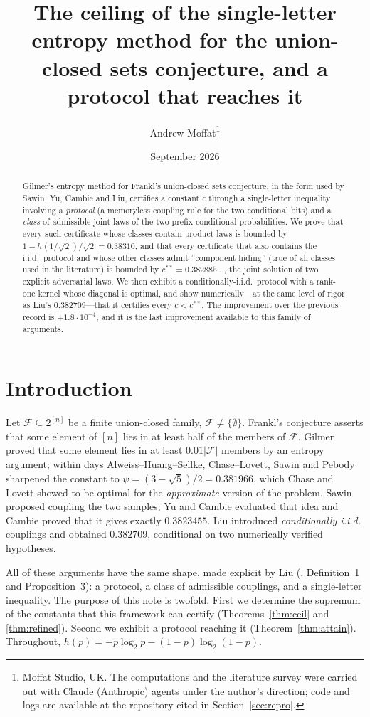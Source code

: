\documentclass[11pt]{article}
\title{The ceiling of the single-letter entropy method for the union-closed sets conjecture, and a protocol that reaches it}
\author{Andrew Moffat\thanks{Moffat Studio, UK. The computations and the literature survey were carried out with Claude (Anthropic) agents under the author's direction; code and logs are available at the repository cited in Section~\ref{sec:repro}.}}
\date{September 2026}
\theoremstyle{definition}
\newcommand{\F}{\mathcal{F}}
\newcommand{\ent}{h}
\begin{document}
\maketitle

\begin{abstract}
Gilmer's entropy method for Frankl's union-closed sets conjecture, in the form used by Sawin, Yu, Cambie and Liu, certifies a constant $c$ through a single-letter inequality involving a \emph{protocol} (a memoryless coupling rule for the two conditional bits) and a \emph{class} of admissible joint laws of the two prefix-conditional probabilities. We prove that every such certificate whose classes contain product laws is bounded by $1-\ent(1/\sqrt2)/\sqrt2=0.38310$, and that every certificate that also contains the i.i.d.\ protocol and whose other classes admit ``component hiding'' (true of all classes used in the literature) is bounded by $c^{**}=0.382885\ldots$, the joint solution of two explicit adversarial laws. We then exhibit a conditionally-i.i.d.\ protocol with a rank-one kernel whose diagonal is optimal, and show numerically---at the same level of rigor as Liu's $0.382709$---that it certifies every $c<c^{**}$. The improvement over the previous record is $+1.8\cdot10^{-4}$, and it is the last improvement available to this family of arguments.
\end{abstract}

\section{Introduction}
Let $\F\subseteq 2^{[n]}$ be a finite union-closed family, $\F\neq\{\emptyset\}$. Frankl's conjecture asserts that some element of $[n]$ lies in at least half of the members of $\F$. Gilmer \cite{Gilmer} proved that some element lies in at least $0.01|\F|$ members by an entropy argument; within days Alweiss--Huang--Sellke, Chase--Lovett, Sawin and Pebody \cite{AHS,CL,Sawin,Pebody} sharpened the constant to $\psi=(3-\sqrt5)/2=0.381966$, which Chase and Lovett showed to be optimal for the \emph{approximate} version of the problem. Sawin proposed coupling the two samples; Yu \cite{Yu} and Cambie \cite{Cambie} evaluated that idea and Cambie proved that it gives exactly $0.3823455$. Liu \cite{Liu} introduced \emph{conditionally i.i.d.} couplings and obtained $0.382709$, conditional on two numerically verified hypotheses.

All of these arguments have the same shape, made explicit by Liu (\cite{Liu}, Definition~1 and Proposition~3): a protocol, a class of admissible couplings, and a single-letter inequality. The purpose of this note is twofold. First we determine the supremum of the constants that this framework can certify (Theorems~\ref{thm:ceil} and \ref{thm:refined}). Second we exhibit a protocol reaching it (Theorem~\ref{thm:attain}). Throughout, $\ent(p)=-p\log_2p-(1-p)\log_2(1-p)$.
\end{document}
